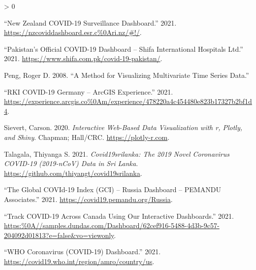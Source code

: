 \documentclass[
]{article}
\newlength{\cslhangindent}
\newenvironment{CSLReferences}[2] %
 {%
  \setlength{\parindent}{0pt}
  \ifodd #1 \everypar{\setlength{\hangindent}{\cslhangindent}}\ignorespaces\fi
  \ifnum #2 > 0
  \setlength{\parskip}{#2\baselineskip}
  \fi
 }%
 {}
\begin{document}
\begin{CSLReferences}{1}{0}
\leavevmode\hypertarget{ref-nz}{}%
{``{New Zealand COVID-19 Surveillance Dashboard}.''} 2021.
\url{https://nzcoviddashboard.esr.c\%0Ari.nz/\#!/}.

\leavevmode\hypertarget{ref-pakistan}{}%
{``{Pakistan's Official COVID-19 Dashboard -- Shifa International
Hospitals Ltd}.''} 2021.
\url{https://www.shifa.com.pk/covid-19-pakistan/}.

\leavevmode\hypertarget{ref-peng2008method}{}%
Peng, Roger D. 2008. {``A Method for Visualizing Multivariate Time
Series Data.''}

\leavevmode\hypertarget{ref-rki}{}%
{``{RKI COVID-19 Germany -- ArcGIS Experience}.''} 2021.
\url{https://experience.arcgis.co\%0Am/experience/478220a4c454480e823b17327b2bf1d4}.

\leavevmode\hypertarget{ref-plotly}{}%
Sievert, Carson. 2020. \emph{Interactive Web-Based Data Visualization
with r, Plotly, and Shiny}. Chapman; Hall/CRC.
\url{https://plotly-r.com}.

\leavevmode\hypertarget{ref-talagala}{}%
Talagala, Thiyanga S. 2021. \emph{Covid19srilanka: The 2019 Novel
Coronavirus COVID-19 (2019-nCoV) Data in Sri Lanka}.
\url{https://github.com/thiyangt/covid19srilanka}.

\leavevmode\hypertarget{ref-russia}{}%
{``{The Global COVId-19 Index (GCI) -- Russia Dashboard -- PEMANDU
Associates}.''} 2021. \url{https://covid19.pemandu.org/Russia}.

\leavevmode\hypertarget{ref-canada}{}%
{``{Track COVID-19 Across Canada Using Our Interactive Dashboards}.''}
2021.
\url{https:\%0A//samples.dundas.com/Dashboard/62cef916-5488-4d3b-9c57-204092d01813?e=false\&vo=viewonly}.

\leavevmode\hypertarget{ref-who}{}%
{``{WHO Coronavirus (COVID-19) Dashboard}.''} 2021.
\url{https://covid19.who.int/region/amro/country/us}.

\end{CSLReferences}
\end{document}
